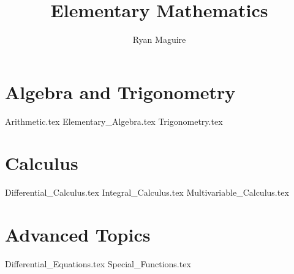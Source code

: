 \documentclass[crop=false,class=book,oneside]{standalone}
\begin{document}
    \newif\ifmathcourses
    \ifx\ifmain\undefined
        \title{Elementary Mathematics}
        \author{Ryan Maguire}
        \date{\vspace{-5ex}}
        \maketitle
        \tableofcontents
        \listoffigures
        \listoftables
        \clearpage
    \fi
    \part{Algebra and Trigonometry}
        {Arithmetic.tex}
        {Elementary_Algebra.tex}
        {Trigonometry.tex}
    \part{Calculus}
        {Differential_Calculus.tex}
        {Integral_Calculus.tex}
        {Multivariable_Calculus.tex}
    \part{Advanced Topics}
        {Differential_Equations.tex}
        {Special_Functions.tex}
\end{document}
